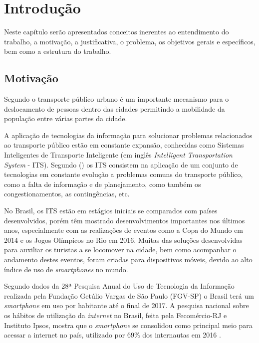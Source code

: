 \chapter{Introdução}

Neste capítulo serão apresentados conceitos inerentes ao entendimento do trabalho, a motivação, a justificativa, o problema, os objetivos gerais e específicos, bem como a estrutura do trabalho.

\section{Motivação}

Segundo  o transporte público urbano é um importante mecanismo para o deslocamento de pessoas dentro das cidades permitindo a mobilidade da população entre várias partes da cidade.

A aplicação de tecnologias da informação para solucionar problemas relacionados ao transporte público estão em constante expansão, conhecidas como Sistemas Inteligentes de Transporte Inteligente (em inglês \textit{Intelligent Transportation System} - ITS). Segundo \citeauthor{associacao-nacional} (\citeyear{associacao-nacional}) os ITS consistem na aplicação de um conjunto de tecnologias em constante evolução a problemas comuns do transporte público, como a falta de informação e de planejamento, como também os congestionamentos, as contingências, etc. 

No Brasil, os ITS estão em estágios iniciais se comparados com países desenvolvidos, porém têm mostrado desenvolvimentos importantes nos últimos anos, especialmente com as realizações de eventos como a Copa do Mundo em 2014 e os Jogos Olímpicos no Rio em 2016\cite{alvarado-campos}. Muitas das soluções desenvolvidas para auxiliar os turistas a se locomover na cidade, bem como acompanhar o andamento destes eventos, foram criadas para dispositivos móveis, devido ao alto índice de uso de \textit{smartphones} no mundo.

Segundo dados da 28ª Pesquisa Anual do Uso de Tecnologia da Informação realizada pela Fundação Getúlio Vargas de São Paulo (FGV-SP) o Brasil terá um \textit{smartphone} em uso por habitante até o final de 2017. A pesquisa nacional sobre os hábitos de utilização da \textit{internet} no Brasil, feita pela Fecomércio-RJ e Instituto Ipsos, mostra que o \textit{smartphone} se consolidou como principal meio para acessar a internet no país, utilizado por 69\% dos internautas em 2016 \cite{agencia-brasil}.

